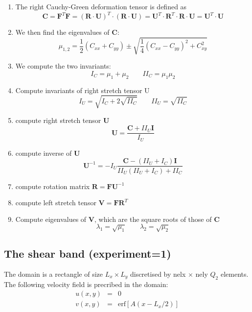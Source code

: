 \begin{enumerate}
\item The right Cauchy-Green deformation tensor is defined as
\[
{\bm C} = {\bm F}^T {\bm F}
= ({\bm R}\cdot {\bm U})^T \cdot ({\bm R} \cdot {\bm U})
= {\bm U}^T \cdot {\bm R}^T \cdot {\bm R} \cdot {\bm U}
= {\bm U}^T \cdot {\bm U}
\]
\item 
We then find the eigenvalues of ${\bm C}$:
\[
\mu_{1,2} = \frac{1}{2}(C_{xx}+C_{yy}) \pm \sqrt{ \frac{1}{4}(C_{xx}-C_{yy})^2 + C_{xy}^2   }
\]
\item We compute the two invariants:
\[
I_C = \mu_1+\mu_2 \qquad II_C = \mu_1\mu_2 
\]
\item Compute invariants of right stretch tensor U
\[
I_U=\sqrt{I_C+2\sqrt{II_C}}
\qquad
II_U=\sqrt{II_C}
\]
\item compute right stretch tensor ${\bm U}$
\[
{\bm U} = \frac{{\bm C}+ II_U {\bm I}}{I_U}
\]
\item compute inverse of ${\bm U}$
\[
{\bm U}^{-1} = - I_U \frac{{\bm C}- (II_U+I_C){\bm I}}{II_U(II_U+I_C)+II_C}
\]
\item compute rotation matrix ${\bm R}={\bm F}{\bm U}^{-1}$

\item compute left stretch tensor ${\bm V}={\bm F}{\bm R}^T$

\item Compute eigenvalues of ${\bm V}$, which are the square roots of those of ${\bm C}$
\[
\lambda_1 = \sqrt{\mu_1}
\qquad
\lambda_2 = \sqrt{\mu_2}
\]

\end{enumerate}










\newpage
\subsection*{The shear band (experiment=1)}

The domain is a rectangle of size $L_x\times L_y$ discretised by nelx $\times$ nely $Q_2$ elements.
The following velocity field is precribed in the domain:
\begin{eqnarray}
u(x,y)&=&0 \\
v(x,y)&=&\text{erf} [A(x-L_x/2)]
\end{eqnarray}

